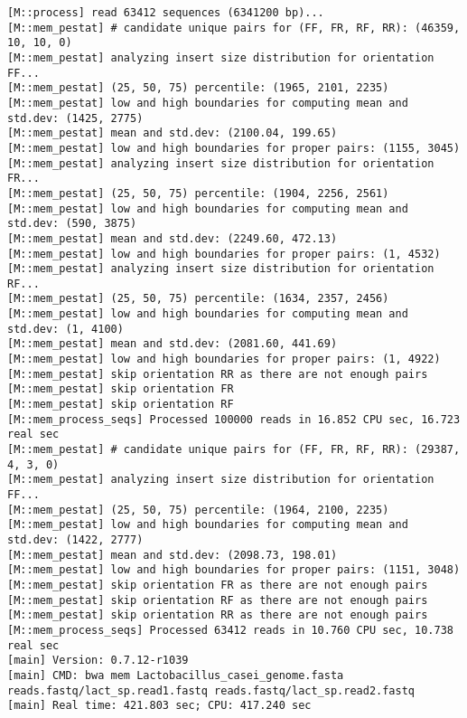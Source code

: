 \begin{lstlisting}
[M::process] read 63412 sequences (6341200 bp)...
[M::mem_pestat] # candidate unique pairs for (FF, FR, RF, RR): (46359, 10, 10, 0)
[M::mem_pestat] analyzing insert size distribution for orientation FF...
[M::mem_pestat] (25, 50, 75) percentile: (1965, 2101, 2235)
[M::mem_pestat] low and high boundaries for computing mean and std.dev: (1425, 2775)
[M::mem_pestat] mean and std.dev: (2100.04, 199.65)
[M::mem_pestat] low and high boundaries for proper pairs: (1155, 3045)
[M::mem_pestat] analyzing insert size distribution for orientation FR...
[M::mem_pestat] (25, 50, 75) percentile: (1904, 2256, 2561)
[M::mem_pestat] low and high boundaries for computing mean and std.dev: (590, 3875)
[M::mem_pestat] mean and std.dev: (2249.60, 472.13)
[M::mem_pestat] low and high boundaries for proper pairs: (1, 4532)
[M::mem_pestat] analyzing insert size distribution for orientation RF...
[M::mem_pestat] (25, 50, 75) percentile: (1634, 2357, 2456)
[M::mem_pestat] low and high boundaries for computing mean and std.dev: (1, 4100)
[M::mem_pestat] mean and std.dev: (2081.60, 441.69)
[M::mem_pestat] low and high boundaries for proper pairs: (1, 4922)
[M::mem_pestat] skip orientation RR as there are not enough pairs
[M::mem_pestat] skip orientation FR
[M::mem_pestat] skip orientation RF
[M::mem_process_seqs] Processed 100000 reads in 16.852 CPU sec, 16.723 real sec
[M::mem_pestat] # candidate unique pairs for (FF, FR, RF, RR): (29387, 4, 3, 0)
[M::mem_pestat] analyzing insert size distribution for orientation FF...
[M::mem_pestat] (25, 50, 75) percentile: (1964, 2100, 2235)
[M::mem_pestat] low and high boundaries for computing mean and std.dev: (1422, 2777)
[M::mem_pestat] mean and std.dev: (2098.73, 198.01)
[M::mem_pestat] low and high boundaries for proper pairs: (1151, 3048)
[M::mem_pestat] skip orientation FR as there are not enough pairs
[M::mem_pestat] skip orientation RF as there are not enough pairs
[M::mem_pestat] skip orientation RR as there are not enough pairs
[M::mem_process_seqs] Processed 63412 reads in 10.760 CPU sec, 10.738 real sec
[main] Version: 0.7.12-r1039
[main] CMD: bwa mem Lactobacillus_casei_genome.fasta reads.fastq/lact_sp.read1.fastq reads.fastq/lact_sp.read2.fastq
[main] Real time: 421.803 sec; CPU: 417.240 sec
\end{lstlisting}